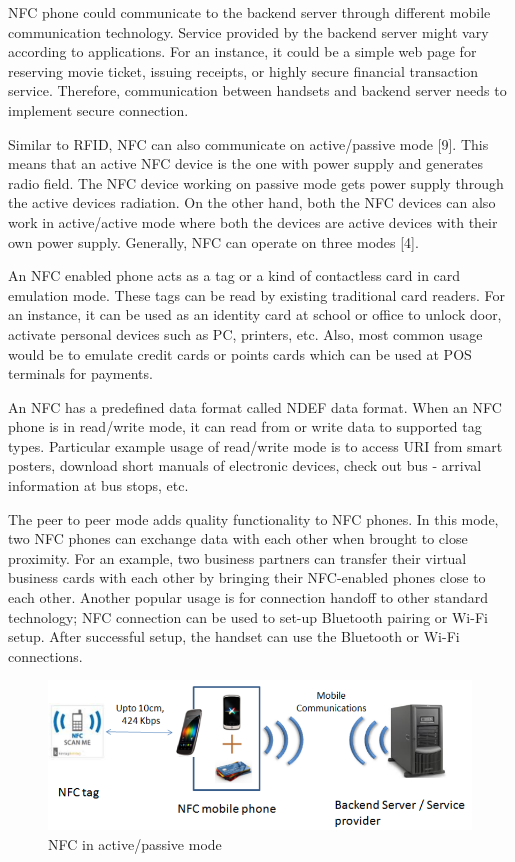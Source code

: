 \documentclass[journal]{IEEEtran}
\begin{document}
NFC phone could communicate to the backend server through different mobile communication technology. Service provided by the backend server might vary according to applications. For an instance, it could be a simple web page for reserving movie ticket, issuing receipts, or highly secure financial transaction service. Therefore, communication between handsets and backend server needs to implement secure connection.

Similar to RFID, NFC can also communicate on active/passive mode [9]. This means that an active NFC device is the one with power supply and generates radio field. The NFC device working on passive mode gets power supply through the active devices radiation. On the other hand, both the NFC devices can also work in active/active mode where both the devices are active devices with their own power supply. Generally, NFC can operate on three modes [4].

An NFC enabled phone acts as a tag or a kind of contactless card in card emulation mode. These tags can be read by existing traditional card readers. For an instance, it can be used as an identity card at school or office to unlock door, activate personal devices such as PC, printers, etc. Also, most
common usage would be to emulate credit cards or points cards which can be used at POS terminals for
payments.

An NFC has a predefined data format called NDEF data format. When an NFC phone is in read/write mode, it can read from or write data to supported tag types. Particular example usage of read/write mode is to access URI from smart posters, download short manuals of electronic devices, check out bus - arrival information at bus stops, etc.

The peer to peer mode adds quality functionality to NFC phones. In this mode, two NFC phones can exchange data with each other when brought to close proximity. For an example, two business partners can transfer their virtual business cards with each other by bringing their NFC-enabled phones close to
each other. Another popular usage is for connection handoff to other standard technology; NFC connection can be used to set-up Bluetooth pairing or Wi-Fi setup. After successful setup, the handset can use the Bluetooth or Wi-Fi connections.
\begin{figure}[htbp]
\centerline{\includegraphics[scale=0.3]{NFCinactive.png}}
\caption{NFC in active/passive mode}
\label{fig}
\end{figure}
\end{document}
